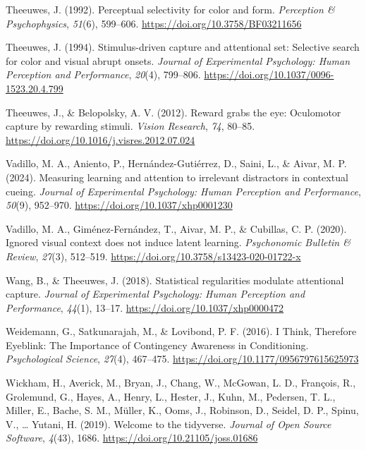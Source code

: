 \documentclass[
  man,
  floatsintext,
  longtable,
  nolmodern,
  notxfonts,
  notimes,
  colorlinks=true,linkcolor=blue,citecolor=blue,urlcolor=blue]{apa7}
\newlength{\cslhangindent}
\newenvironment{CSLReferences}[2] %
 {\begin{list}{}{%
  \setlength{\itemindent}{0pt}
  \setlength{\leftmargin}{0pt}
  \setlength{\parsep}{0pt}
  \ifodd #1
   \setlength{\leftmargin}{\cslhangindent}
   \setlength{\itemindent}{-1\cslhangindent}
  \fi
  \setlength{\itemsep}{#2\baselineskip}}}
 {\end{list}}
\begin{document}
\begin{CSLReferences}{1}{0}
Theeuwes, J. (1992). Perceptual selectivity for color and form.
\emph{Perception \& Psychophysics}, \emph{51}(6), 599--606.
\url{https://doi.org/10.3758/BF03211656}

Theeuwes, J. (1994). Stimulus-driven capture and attentional set:
Selective search for color and visual abrupt onsets. \emph{Journal of
Experimental Psychology: Human Perception and Performance},
\emph{20}(4), 799--806. \url{https://doi.org/10.1037/0096-1523.20.4.799}

Theeuwes, J., \& Belopolsky, A. V. (2012). Reward grabs the eye:
Oculomotor capture by rewarding stimuli. \emph{Vision Research},
\emph{74}, 80--85. \url{https://doi.org/10.1016/j.visres.2012.07.024}

Vadillo, M. A., Aniento, P., Hernández-Gutiérrez, D., Saini, L., \&
Aivar, M. P. (2024). Measuring learning and attention to irrelevant
distractors in contextual cueing. \emph{Journal of Experimental
Psychology: Human Perception and Performance}, \emph{50}(9), 952--970.
\url{https://doi.org/10.1037/xhp0001230}

Vadillo, M. A., Giménez-Fernández, T., Aivar, M. P., \& Cubillas, C. P.
(2020). Ignored visual context does not induce latent learning.
\emph{Psychonomic Bulletin \& Review}, \emph{27}(3), 512--519.
\url{https://doi.org/10.3758/s13423-020-01722-x}

Wang, B., \& Theeuwes, J. (2018). Statistical regularities modulate
attentional capture. \emph{Journal of Experimental Psychology: Human
Perception and Performance}, \emph{44}(1), 13--17.
\url{https://doi.org/10.1037/xhp0000472}

Weidemann, G., Satkunarajah, M., \& Lovibond, P. F. (2016). I Think,
Therefore Eyeblink: The Importance of Contingency Awareness in
Conditioning. \emph{Psychological Science}, \emph{27}(4), 467--475.
\url{https://doi.org/10.1177/0956797615625973}

Wickham, H., Averick, M., Bryan, J., Chang, W., McGowan, L. D.,
François, R., Grolemund, G., Hayes, A., Henry, L., Hester, J., Kuhn, M.,
Pedersen, T. L., Miller, E., Bache, S. M., Müller, K., Ooms, J.,
Robinson, D., Seidel, D. P., Spinu, V., \ldots{} Yutani, H. (2019).
Welcome to the {tidyverse}. \emph{Journal of Open Source Software},
\emph{4}(43), 1686. \url{https://doi.org/10.21105/joss.01686}


\end{CSLReferences}
\end{document}
